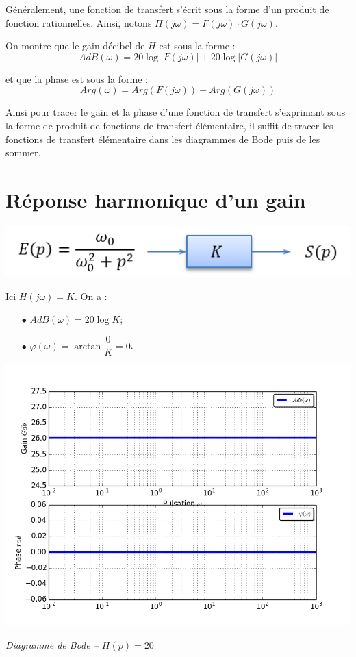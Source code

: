 \documentclass[10pt,oneside]{article}
\begin{document}
Généralement, une fonction de transfert s'écrit sous la forme d'un produit de fonction rationnelles. Ainsi, notons $H(j\omega)=F(j\omega) \cdot G(j\omega)$. 

On montre que le gain décibel de $H$ est sous la forme :
$$
AdB(\omega) = 20 \log |F(j\omega) |+20 \log |G(j\omega) |
$$

et que la phase est sous la forme :
$$
Arg(\omega) = Arg \left(F(j\omega) \right)+Arg \left(G(j\omega) \right)
$$

Ainsi pour tracer le gain et la phase d'une fonction de transfert s'exprimant sous la forme de produit de fonctions de transfert élémentaire, il suffit de tracer les fonctions de transfert élémentaire dans les diagrammes de Bode puis de les sommer.

\section{Réponse harmonique d'un gain}

\begin{minipage}[c]{.48\linewidth}
\begin{center}
\includegraphics[width=.9\textwidth]{png/gain_bloc}
\end{center}

Ici $H(j\omega)=K$. On a :
\begin{itemize}
\item [$\bullet$] $AdB(\omega)=20 \log K$;
\item [$\bullet$] $\varphi(\omega)= \arctan \dfrac{0}{K} = 0$.
\end{itemize}
\end{minipage}\hfill
\begin{minipage}[c]{.48\linewidth}
\begin{center}
\includegraphics[width=.9\textwidth]{png/gain_bode}

\textit{Diagramme de Bode -- $H(p)=20$}
\end{center}
\end{minipage}
\end{document}
